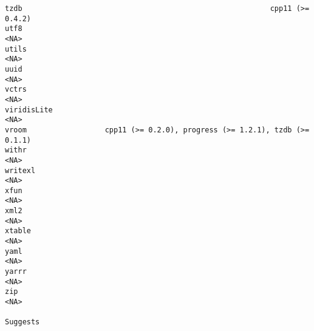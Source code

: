 \documentclass[
  letterpaper,
  DIV=11,
  numbers=noendperiod]{scrreprt}
\begin{document}
\begin{verbatim}
tzdb                                                         cpp11 (>= 0.4.2)
utf8                                                                     <NA>
utils                                                                    <NA>
uuid                                                                     <NA>
vctrs                                                                    <NA>
viridisLite                                                              <NA>
vroom                  cpp11 (>= 0.2.0), progress (>= 1.2.1), tzdb (>= 0.1.1)
withr                                                                    <NA>
writexl                                                                  <NA>
xfun                                                                     <NA>
xml2                                                                     <NA>
xtable                                                                   <NA>
yaml                                                                     <NA>
yarrr                                                                    <NA>
zip                                                                      <NA>
                                                                                                                                                                                                                                                                                                                                                                                                                                                                                                                                                                                                                                                                                                                                                                                                                                                                                                                                                                                                                                                                                                                                                                                                                                                                                                     Suggests

\end{verbatim}
\end{document}

